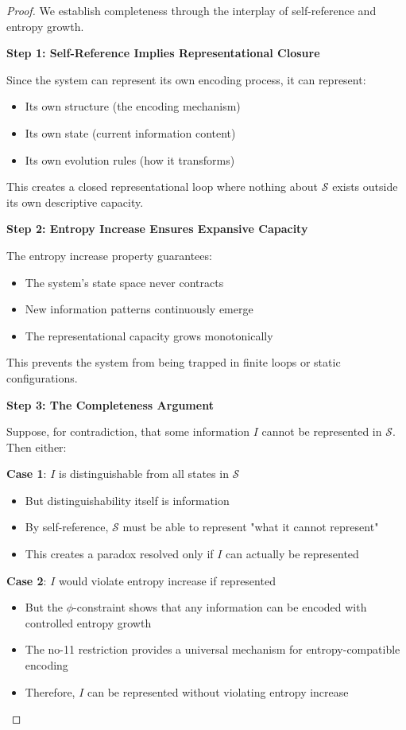 \documentclass[12pt,letterpaper]{article}
\begin{document}
\begin{proof}
We establish completeness through the interplay of self-reference and entropy growth.

\textbf{Step 1: Self-Reference Implies Representational Closure}

Since the system can represent its own encoding process, it can represent:
\begin{itemize}
\item Its own structure (the encoding mechanism)
\item Its own state (current information content)
\item Its own evolution rules (how it transforms)
\end{itemize}

This creates a closed representational loop where nothing about $\mathcal{S}$ exists outside its own descriptive capacity.

\textbf{Step 2: Entropy Increase Ensures Expansive Capacity}

The entropy increase property guarantees:
\begin{itemize}
\item The system's state space never contracts
\item New information patterns continuously emerge
\item The representational capacity grows monotonically
\end{itemize}

This prevents the system from being trapped in finite loops or static configurations.

\textbf{Step 3: The Completeness Argument}

Suppose, for contradiction, that some information $I$ cannot be represented in $\mathcal{S}$. Then either:

\textbf{Case 1}: $I$ is distinguishable from all states in $\mathcal{S}$
\begin{itemize}
\item But distinguishability itself is information
\item By self-reference, $\mathcal{S}$ must be able to represent "what it cannot represent"
\item This creates a paradox resolved only if $I$ can actually be represented
\end{itemize}

\textbf{Case 2}: $I$ would violate entropy increase if represented
\begin{itemize}
\item But the $\phi$-constraint shows that any information can be encoded with controlled entropy growth
\item The no-11 restriction provides a universal mechanism for entropy-compatible encoding
\item Therefore, $I$ can be represented without violating entropy increase
\end{itemize}


\end{proof}
\end{document}
